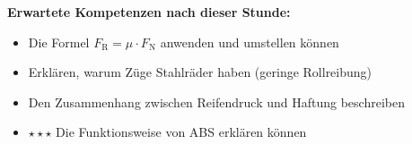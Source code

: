 \documentclass[11pt,a4paper]{article}
\newcommand{\stern}[1]{\textcolor{merkerand}{\textbf{#1}}}
\begin{document}
\vspace{0.4em}

\begin{merkkasten}
\textbf{Erwartete Kompetenzen nach dieser Stunde:}

\vspace{0.2em}
\small
\begin{itemize}[leftmargin=*, itemsep=2pt]
    \item Die Formel $F_\text{R} = \mu \cdot F_\text{N}$ anwenden und umstellen können
    \item Erklären, warum Züge Stahlräder haben (geringe Rollreibung)
    \item Den Zusammenhang zwischen Reifendruck und Haftung beschreiben
    \item \stern{$\star\star\star$} Die Funktionsweise von ABS erklären können
\end{itemize}
\end{merkkasten}
\end{document}
